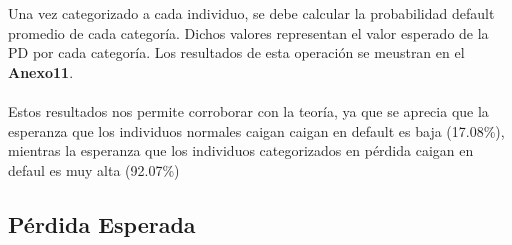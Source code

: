 \documentclass[11pt,fleqn]{book} %
\numberwithin{equation}{section} %
\numberwithin{figure}{section} %
\numberwithin{table}{section} %
\begin{document}
Una vez categorizado a cada individuo, se debe calcular la probabilidad default promedio de cada categoría. Dichos valores representan el valor esperado de la PD por cada categoría. Los resultados de esta operación se meustran en el \textbf{Anexo11}.
\\\\
Estos resultados nos permite corroborar con la teoría, ya que se aprecia que la esperanza que los individuos normales caigan caigan en default es baja (17.08\%), mientras la esperanza que los individuos categorizados en pérdida caigan en defaul es muy alta (92.07\%)

\subsection{Pérdida Esperada}
\end{document}

